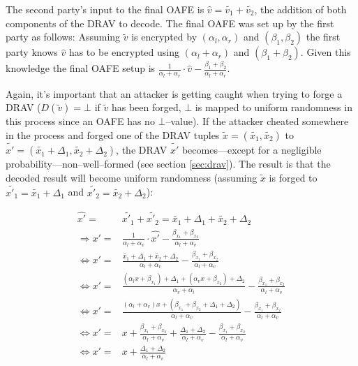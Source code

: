 The second party's input to the final OAFE is $\widehat{v} = \widetilde{v_1} +
\widetilde{v_2}$, the addition of both components of the DRAV to decode.  The
final OAFE was set up by the first party as follows: Assuming $\widetilde{v}$ is
encrypted by $(\alpha_l, \alpha_r)$ and $(\beta_1, \beta_2)$ the first party
knows $\widehat{v}$ has to be encrypted using $(\alpha_l + \alpha_r)$ and
$(\beta_1 + \beta_2)$.  Given this knowledge the final OAFE setup is
$\frac{1}{\alpha_l + \alpha_r} \cdot \widehat{v} - \frac{\beta_1 +
\beta_2}{\alpha_l + \alpha_r}$.

Again, it's important that an attacker is getting caught when trying to forge a
DRAV ($D(\widetilde{v}) = \bot$ if $\widetilde{v}$ has been forged, $\bot$ is
mapped to uniform randomness in this process since an OAFE has no
$\bot$--value). If the attacker cheated somewhere in the process and forged one
of the DRAV tuples $\widetilde{x} = (\widetilde{x_1}, \widetilde{x_2})$ to
$\widetilde{x'} = (\widetilde{x_1} + \Delta_1, \widetilde{x_2} + \Delta_2)$, the
DRAV $\widetilde{x'}$ becomes---except for a negligible
probability---non--well--formed (see section \ref{sec:drav}). The result is that
the decoded result will become uniform randomness (assuming $\widetilde{x}$ is
forged to $\widetilde{x'_1} = \widetilde{x_1} + \Delta_1$ and $\widetilde{x'_2}
= \widetilde{x_2} + \Delta_2$):

\begin{align*}
  \widehat{x'} = & \widetilde{x'_1} + \widetilde{x'_2} = \widetilde{x_1} +
  \Delta_1 + \widetilde{x_2} + \Delta_2 \\
  \Rightarrow x' = & \frac{1}{\alpha_l + \alpha_v} \cdot \widehat{x'} -
  \frac{\beta_{x_1} +
  \beta_{x_2}}{\alpha_l + \alpha_v} \\
  \Leftrightarrow x' = & \frac{\widetilde{x_1} + \Delta_1 +
  \widetilde{x_2} + \Delta_2}{\alpha_l + \alpha_v} -
  \frac{\beta_{x_1} +\beta_{x_2}}{\alpha_l + \alpha_v}\\
  \Leftrightarrow x' = & \frac{(\alpha_l x + \beta_{x_1}) + \Delta_1 +
  (\alpha_v x + \beta_{x_2}) + \Delta_2}{\alpha_v + \alpha_l} -
  \frac{\beta_{x_1} +\beta_{x_2}}{\alpha_l + \alpha_v} \\
  \Leftrightarrow x' = & \frac{(\alpha_l+\alpha_v)x + (\beta_{x_1}+\beta_{x_2} +
  \Delta_1+\Delta_2)}{\alpha_l+\alpha_v} -
  \frac{\beta_{x_1} +\beta_{x_2}}{\alpha_l + \alpha_v} \\
  \Leftrightarrow x' = & x + \frac{\beta_{x_1}+\beta_{x_2}}{\alpha_l+\alpha_v}
  + \frac{\Delta_1 + \Delta_2}{\alpha_l + \alpha_v} -
  \frac{\beta_{x_1}+\beta_{x_2}}{\alpha_l + \alpha_v} \\
  \Leftrightarrow x' = & x + \frac{\Delta_1 + \Delta_2}{\alpha_l + \alpha_v}\\
\end{align*}

